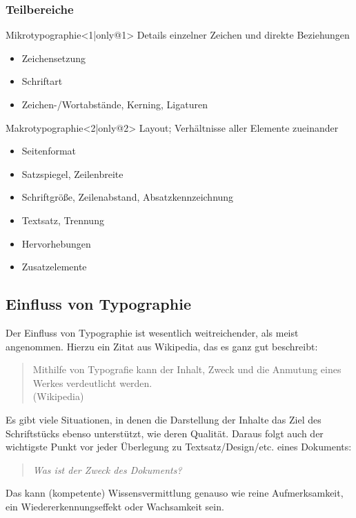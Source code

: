 \begin{frame}[t]
  \frametitle<presentation>{Teilbereiche}
  \begin{block}{Mikrotypographie}<1|only@1>
    Details einzelner Zeichen und direkte Beziehungen
    \begin{itemize}
    \item Zeichensetzung
    \item Schriftart
    \item Zeichen-/Wortabstände, Kerning, Ligaturen
    \end{itemize}
  \end{block}
  \begin{block}{Makrotypographie}<2|only@2>
    Layout; Verhältnisse aller Elemente zueinander
    \begin{itemize}
    \item Seitenformat
    \item Satzspiegel, Zeilenbreite
    \item Schriftgröße, Zeilenabstand, Absatzkennzeichnung
    \item Textsatz, Trennung
    \item Hervorhebungen
    \item Zusatzelemente
    \end{itemize}
  \end{block}
\end{frame}


\subsection{Einfluss von Typographie}
\frame{\subsectionpage}
Der Einfluss von Typographie ist wesentlich weitreichender, als meist
angenommen. Hierzu ein Zitat aus Wikipedia, das es ganz gut beschreibt:

\begin{frame}
  \begin{quote}
    Mithilfe von Typografie kann der Inhalt, Zweck und die Anmutung eines
    Werkes verdeutlicht werden. \\(Wikipedia)
  \end{quote}
\end{frame}

Es gibt viele Situationen, in denen die Darstellung der Inhalte das
Ziel des Schriftstücks ebenso unterstützt, wie deren Qualität.
Daraus folgt auch der wichtigste Punkt vor jeder Überlegung zu
Textsatz/Design/etc. eines Dokuments:
\begin{quote}
  \emph{Was ist der \emph{Zweck} des Dokuments?}
\end{quote}
Das kann (kompetente) Wissensvermittlung genauso wie reine
Aufmerksamkeit, ein Wiedererkennungseffekt oder Wachsamkeit sein.

